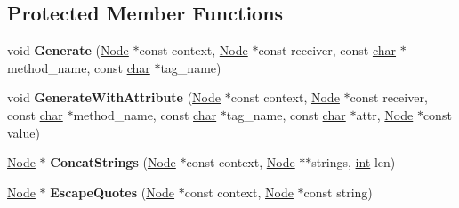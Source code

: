 \subsection*{Protected Member Functions}
\begin{DoxyCompactItemize}
\item 
\mbox{\label{classv8_1_1internal_1_1StringHtmlAssembler_adf1f332092c01ae61580487131b117ca}} 
void {\bfseries Generate} (\mbox{\hyperlink{classv8_1_1internal_1_1compiler_1_1Node}{Node}} $\ast$const context, \mbox{\hyperlink{classv8_1_1internal_1_1compiler_1_1Node}{Node}} $\ast$const receiver, const \mbox{\hyperlink{classchar}{char}} $\ast$method\+\_\+name, const \mbox{\hyperlink{classchar}{char}} $\ast$tag\+\_\+name)
\item 
\mbox{\label{classv8_1_1internal_1_1StringHtmlAssembler_a2d7790c4291c039e84f8f2dd4014b185}} 
void {\bfseries Generate\+With\+Attribute} (\mbox{\hyperlink{classv8_1_1internal_1_1compiler_1_1Node}{Node}} $\ast$const context, \mbox{\hyperlink{classv8_1_1internal_1_1compiler_1_1Node}{Node}} $\ast$const receiver, const \mbox{\hyperlink{classchar}{char}} $\ast$method\+\_\+name, const \mbox{\hyperlink{classchar}{char}} $\ast$tag\+\_\+name, const \mbox{\hyperlink{classchar}{char}} $\ast$attr, \mbox{\hyperlink{classv8_1_1internal_1_1compiler_1_1Node}{Node}} $\ast$const value)
\item 
\mbox{\label{classv8_1_1internal_1_1StringHtmlAssembler_a1ca3d4fe7092e7434726e9419c299113}} 
\mbox{\hyperlink{classv8_1_1internal_1_1compiler_1_1Node}{Node}} $\ast$ {\bfseries Concat\+Strings} (\mbox{\hyperlink{classv8_1_1internal_1_1compiler_1_1Node}{Node}} $\ast$const context, \mbox{\hyperlink{classv8_1_1internal_1_1compiler_1_1Node}{Node}} $\ast$$\ast$strings, \mbox{\hyperlink{classint}{int}} len)
\item 
\mbox{\label{classv8_1_1internal_1_1StringHtmlAssembler_a3bef1d808529a1dc99cc151fc77cd01a}} 
\mbox{\hyperlink{classv8_1_1internal_1_1compiler_1_1Node}{Node}} $\ast$ {\bfseries Escape\+Quotes} (\mbox{\hyperlink{classv8_1_1internal_1_1compiler_1_1Node}{Node}} $\ast$const context, \mbox{\hyperlink{classv8_1_1internal_1_1compiler_1_1Node}{Node}} $\ast$const string)
\end{DoxyCompactItemize}
